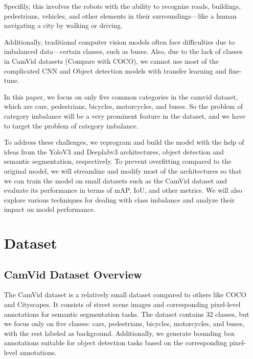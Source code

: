 \documentclass[conference]{IEEEtran}
\begin{document}
Specifily, this involves the robots with the ability to recognize roads, buildings, pedestrians, vehicles, and other elements in their surroundings—like a human navigating a city by walking or driving.

Additionally, traditional computer vision models often face difficulties due to imbalanced data—certain classes, such as buses. Also, due to the lack of classes in CamVid datasets (Compare with COCO), we cannot use most of the complicated CNN and Object detection models with transfer learning and fine-tune.

In this paper, we focus on only five common categories in the camvid dataset, which are cars, pedestrians, bicycles, motorcycles, and buses. So the problem of category imbalance will be a very prominent feature in the dataset, and we have to target the problem of category imbalance.

To address these challenges, we reprogram and build the model with the help of ideas from the YoloV3 and Deeplabv3 architectures, object detection and semantic segmentation, respectively. To prevent overfitting compared to the original model, we will streamline and modify most of the architectures so that we can train the model on small datasets such as the CamVid dataset and evaluate its performance in terms of mAP, IoU, and other metrics. We will also explore various techniques for dealing with class imbalance and analyze their impact on model performance.
\section{Dataset}
\subsection{CamVid Dataset Overview}
The CamVid dataset is a relatively small dataset compared to others like COCO and Cityscapes. It consists of street scene images and corresponding pixel-level annotations for semantic segmentation tasks. The dataset contains 32 classes, but we focus only on five classes: cars, pedestrians, bicycles, motorcycles, and buses, with the rest labeled as background. Additionally, we generate bounding box annotations suitable for object detection tasks based on the corresponding pixel-level annotations.
\end{document}
